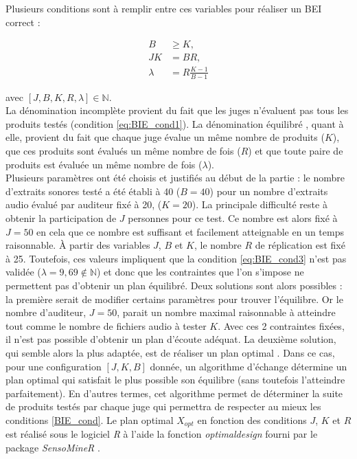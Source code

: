 Plusieurs conditions sont à remplir entre ces variables pour réaliser un BEI correct :

\begin{subequations}\label{BIE_cond}
\begin{align}
B &\geq K, \label{eq:BIE_cond1}\\
JK &= BR, \label{eq:BIE_cond2}\\
\lambda &= R\frac{K-1}{B-1} \label{eq:BIE_cond3}
\end{align}
\end{subequations}

avec $\left[J, B, K, R, \lambda\right] \in \mathbb{N}$.\\

La dénomination \og incomplète \fg{} provient du fait que les juges n'évaluent pas tous les produits testés (condition \ref{eq:BIE_cond1}). La dénomination \og équilibré \fg{}, quant à elle, provient du fait que chaque juge évalue un même nombre de produits ($K$), que ces produits sont évalués un même nombre de fois ($R$) et que toute paire de produits est évaluée un même nombre de fois ($\lambda$). \\

Plusieurs paramètres ont été choisis et justifiés au début de la partie : le nombre d'extraits sonores testé a été établi à 40 ($B = 40$) pour un nombre d'extraits audio évalué par auditeur fixé à 20, ($K = 20$). La principale difficulté reste à obtenir la participation de $J$ personnes pour ce test. Ce nombre est alors fixé à $J = 50$ en cela que ce nombre est suffisant et facilement atteignable en un temps raisonnable. À partir des variables $J$, $B$ et $K$, le nombre $R$ de réplication est fixé à 25. Toutefois, ces valeurs impliquent que la condition \ref{eq:BIE_cond3} n'est pas validée ($\lambda = 9,69 \notin \mathbb{N}$) et donc que les contraintes que l'on s'impose ne permettent pas d'obtenir un plan équilibré. Deux solutions sont alors possibles : la première serait de modifier certains paramètres pour trouver l'équilibre. Or le nombre d'auditeur, $J = 50$, parait un nombre maximal raisonnable à atteindre tout comme le nombre de fichiers audio à tester $K$. Avec ces 2 contraintes fixées, il n'est pas possible d'obtenir un plan d'écoute adéquat. La deuxième solution, qui semble alors la plus adaptée, est de réaliser un plan optimal \cite{pages_blocs_2007}. Dans ce cas, pour une configuration $\left[J, K, B\right]$ donnée, un algorithme d'échange détermine un \og plan optimal \fg{} qui satisfait le plus possible son équilibre (sans toutefois l'atteindre parfaitement). En d'autres termes, cet algorithme permet de déterminer la suite de produits testés par chaque juge qui permettra de respecter au mieux les conditions \ref{BIE_cond}.
Le plan optimal $X_{opt}$ en fonction des conditions $J$, $K$ et $R$ est réalisé sous le logiciel \textit{R} à l'aide la fonction \textit{optimaldesign} fourni par le package \textit{SensoMineR} \cite{le_sensominer_2008}.


